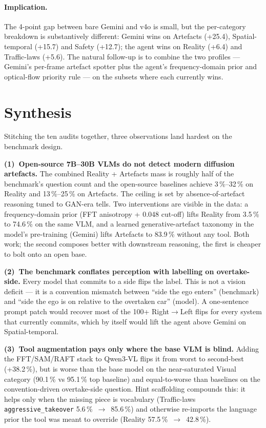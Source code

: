 \documentclass[11pt,a4paper]{article}
\newcommand{\pct}[1]{#1\,\%}
\newcommand{\code}[1]{\texttt{#1}}
\begin{document}
\paragraph{Implication.} The 4-point gap between bare Gemini and v4o is
small, but the per-category breakdown is substantively different:
Gemini wins on Artefacts (+25.4), Spatial-temporal (+15.7) and
Safety (+12.7); the agent wins on Reality (+6.4) and Traffic-laws
(+5.6). The natural follow-up is to combine the two profiles ---
Gemini's per-frame artefact spotter plus the agent's
frequency-domain prior and optical-flow priority rule --- on the
subsets where each currently wins.

\section{Synthesis}
\label{sec:synth}

Stitching the ten audits together, three observations land hardest on
the benchmark design.

\textbf{(1)~Open-source 7B--30B VLMs do not detect modern diffusion
artefacts.} The combined Reality + Artefacts mass is roughly half of the
benchmark's question count and the open-source baselines achieve
\pct{3}--\pct{32} on Reality and \pct{13}--\pct{25} on Artefacts. The
ceiling is set by absence-of-artefact reasoning tuned to GAN-era tells.
Two interventions are visible in the data: a frequency-domain prior
(FFT anisotropy + 0.048 cut-off) lifts Reality from \pct{3.5} to
\pct{74.6} on the same VLM, and a learned generative-artefact taxonomy
in the model's pre-training (Gemini) lifts Artefacts to \pct{83.9}
without any tool. Both work; the second composes better with downstream
reasoning, the first is cheaper to bolt onto an open base.

\textbf{(2)~The benchmark conflates perception with labelling on
overtake-side.} Every model that commits to a side flips the label.
This is not a vision deficit --- it is a convention mismatch between
``side the ego enters'' (benchmark) and ``side the ego is on relative
to the overtaken car'' (model). A one-sentence prompt patch would
recover most of the 100+ Right$\to$Left flips for every system that
currently commits, which by itself would lift the agent above Gemini on
Spatial-temporal.

\textbf{(3)~Tool augmentation pays only where the base VLM is blind.}
Adding the FFT/SAM/RAFT stack to Qwen3-VL flips it from worst to
second-best (+\pct{38.2}), but is worse than the base model on the
near-saturated Visual category (\pct{90.1} vs \pct{95.1} top baseline)
and equal-to-worse than baselines on the convention-driven
overtake-side question. Hint scaffolding compounds this: it helps only
when the missing piece is vocabulary
(Traffic-laws \code{aggressive\_takeover} \pct{5.6}~$\to$~\pct{85.6})
and otherwise re-imports the language prior the tool was meant to
override (Reality \pct{57.5}~$\to$~\pct{42.8}).
\end{document}
